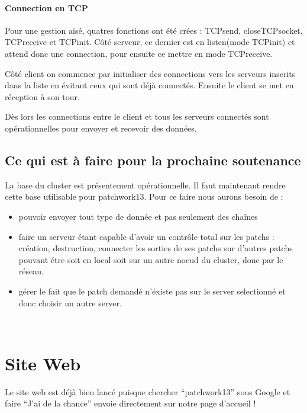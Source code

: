 \documentclass[14pt,a4paper]{report}
\begin{document}
\subsubsection{Connection en TCP}
Pour une gestion ais\'e, quatres fonctions ont \'et\'e cr\'ees :
TCPsend, closeTCPsocket, TCPreceive et TCPinit. 
C\^ot\'e serveur, ce dernier est en listen(mode TCPinit) et attend donc une 
connection, pour ensuite ce mettre en mode TCPreceive.

C\^ot\'e client on commence par initialiser des connections vers les serveurs 
inscrits dans la liste en \'evitant ceux qui sont d\'ej\`a connect\'es.
Ensuite le client se met en r\'eception \`a son tour.

D\`es lors les connections entre le client et tous les serveurs connect\'es 
sont op\'erationnelles pour envoyer et recevoir des donn\'ees. \\

\newpage

\section{Ce qui est \`a faire pour la prochaine soutenance}

La base du cluster est pr\'esentement op\'erationnelle. Il faut maintenant 
rendre cette base utilisable pour patchwork13.
Pour ce faire nous aurons besoin de :

\begin{itemize}
\item pouvoir envoyer tout type de donn\'ee et pas seulement des cha\^ines 
\item faire un serveur \'etant capable d'avoir un contr\^ole total sur les 
patchs : cr\'eation, destruction, connecter les sorties de ses patchs sur 
d'autres patchs pouvant \'etre soit en local soit sur un autre noeud du 
cluster, donc par le r\'eseau.
\item g\'erer le fait que le patch demand\'e n'\'existe pas sur le server 
selectionn\'e et donc choisir un autre server.
\end{itemize}
\rule{0cm}{1cm} \\


\chapter{Site Web}

Le site web est d\'ej\`a bien lanc\'e puisque chercher ``patchwork13''
sous Google et faire ``J'ai de la chance'' envoie directement sur
notre page d'accueil !
\end{document}
